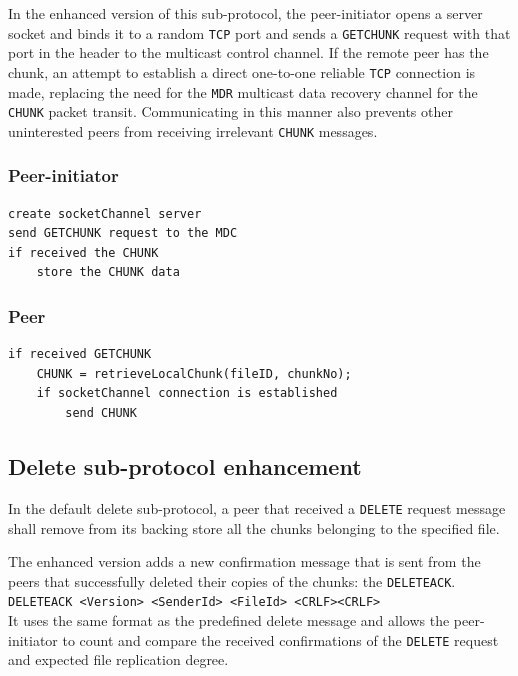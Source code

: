 \documentclass[a4paper,11pt]{article}
\begin{document}
In the enhanced version of this sub-protocol, the peer-initiator opens a server socket and binds it to a random \texttt{TCP} port and sends a \texttt{GETCHUNK} request with that port in the header to the multicast control channel. If the remote peer has the chunk, an attempt to establish a direct one-to-one reliable \texttt{TCP} connection is made, replacing the need for the \texttt{MDR} multicast data recovery channel for the \texttt{CHUNK} packet transit. Communicating in this manner also prevents other uninterested peers from receiving irrelevant \texttt{CHUNK} messages.

\subsubsection*{Peer-initiator}
\begin{verbatim} 
create socketChannel server
send GETCHUNK request to the MDC
if received the CHUNK
    store the CHUNK data
\end{verbatim}

\subsubsection*{Peer}
\begin{verbatim} 
if received GETCHUNK
    CHUNK = retrieveLocalChunk(fileID, chunkNo);
    if socketChannel connection is established
        send CHUNK
\end{verbatim}

\subsection{Delete sub-protocol enhancement}
In the default delete sub-protocol, a peer that received a \texttt{DELETE} request message shall remove from its backing store all the chunks belonging to the specified file.

The enhanced version adds a new confirmation message that is sent from the peers that successfully deleted their copies of the chunks: the \texttt{DELETEACK}.\\[0.1cm]

\texttt{DELETEACK <Version> <SenderId> <FileId> <CRLF><CRLF>}\\[0.1cm]

It uses the same format as the predefined delete message and allows the peer-initiator to count and compare the received confirmations of the \texttt{DELETE} request and expected file replication degree.
\end{document}
